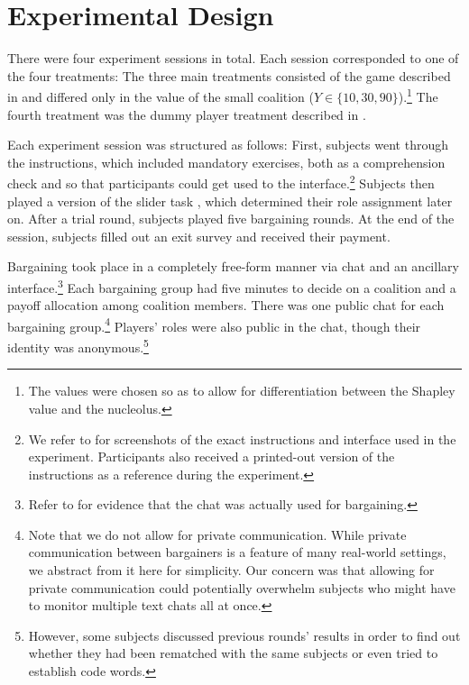 \section{Experimental Design} \label{sec:exp_design}


There were four experiment sessions in total. Each session corresponded to one of the four treatments: The three main treatments consisted of the game described in  and differed only in the value of the small coalition ($Y \in \{10,30,90\}$).\footnote{The values were chosen so as to allow for differentiation between the Shapley value and the nucleolus.} The fourth treatment was the dummy player treatment described in . 

Each experiment session was structured as follows: First, subjects went through the instructions, which included mandatory exercises, both as a comprehension check and so that participants could get used to the interface.\footnote{We refer to  for screenshots of the exact instructions and interface used in the experiment. Participants also received a printed-out version of the instructions as a reference during the experiment.} Subjects then played a version of the slider task \parencite{GillProwse2012slider}, which determined their role assignment later on. After a trial round, subjects played five bargaining rounds. At the end of the session, subjects filled out an exit survey and received their payment. 

Bargaining took place in a completely free-form manner via chat and an ancillary interface.\footnote{Refer to  for evidence that the chat was actually used for bargaining.} Each bargaining group had five minutes to decide on a coalition and a payoff allocation among coalition members. There was one public chat for each bargaining group.\footnote{Note that we do not allow for private communication. While private communication between bargainers is a feature of many real-world settings, we abstract from it here for simplicity. Our concern was that allowing for private communication could potentially overwhelm subjects who might have to monitor multiple text chats all at once.} Players' roles were also public in the chat, though their identity was anonymous.\footnote{However, some subjects discussed previous rounds' results in order to find out whether they had been rematched with the same subjects or even tried to establish code words.} 


